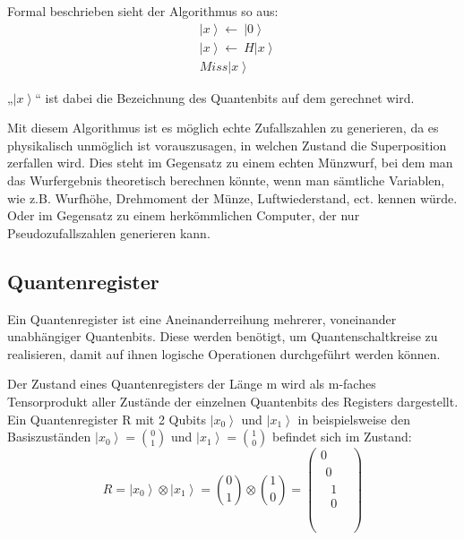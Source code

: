 Formal beschrieben sieht der Algorithmus so aus:
\begin{align*}
    &\left|x\right\rangle \gets\ \left|0\right\rangle  \\
    &\left|x\right\rangle \gets\ H\left|x\right\rangle \\
    &Miss\left|x\right\rangle
\end{align*}

	
„$\left|x\right\rangle$“ ist dabei die Bezeichnung des Quantenbits auf dem gerechnet wird.

Mit diesem Algorithmus ist es möglich echte Zufallszahlen zu generieren, da es physikalisch unmöglich ist vorauszusagen, in welchen Zustand die Superposition zerfallen wird. Dies steht im Gegensatz zu einem echten Münzwurf, bei dem man das Wurfergebnis theoretisch berechnen könnte, wenn man sämtliche Variablen, wie z.B. Wurfhöhe, Drehmoment der Münze, Luftwiederstand, ect. kennen würde. Oder im Gegensatz zu einem herkömmlichen Computer, der nur Pseudozufallszahlen generieren kann. 
\subsection{Quantenregister}

Ein Quantenregister ist eine Aneinanderreihung mehrerer, voneinander unabhängiger Quantenbits. Diese werden benötigt, um Quantenschaltkreise zu realisieren, damit auf ihnen logische Operationen durchgeführt werden können. 

Der Zustand eines Quantenregisters der Länge m wird als m-faches Tensorprodukt aller Zustände der einzelnen Quantenbits des Registers dargestellt. Ein Quantenregister R mit 2 Qubits $\left|\left.x_0\right\rangle\right.$ und $\left|\left.x_1\right\rangle\right.$ in beispielsweise den Basiszuständen $\left|\left.x_0\right\rangle\right.=\binom{0}{1}$ und $\left|\left.x_1\right\rangle\right.=\binom{1}{0}$ befindet sich im Zustand:
\begin{equation}
    R=\left|\left.x_0\right\rangle\right.\otimes\left|\left.x_1\right\rangle\right.=\binom{0}{1}\otimes\binom{1}{0}=\left(\begin{matrix}0\\\begin{matrix}0\\\begin{matrix}1\\0\\\end{matrix}\\\end{matrix}\\\end{matrix}\right)
\end{equation}

